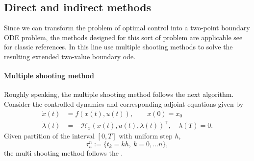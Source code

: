 \subsection{Direct and indirect methods}
Since we can transform the problem of optimal control into a two-point 
boundary ODE problem, the methods designed for this sort of problem are 
applicable see \cite{Keller1976, Ascher1987, Stoer2013} for classic references. 
In this line \cite{Caetano2001,Yan2008} use multiple shooting methods to 
solve the resulting extended two-value boundary ode.
\paragraph{Multiple shooting method}
Roughly speaking, the multiple shooting method follows the next algorithm.
Consider the controlled dynamics and corresponding adjoint equations given by
\begin{equation}
  \label{eqn:extended_tpvbp}
  \begin{aligned}
    \dot{x}(t) &= 
    f(x(t), u(t)), \qquad x(0)=x_0 \\
    \dot{\lambda}(t) &=
    -\mathcal{H}_x(x(t),u(t),\lambda(t))^\top, \quad 
    \lambda(T)=0.
  \end{aligned}
\end{equation}
Given  partition of the interval $[0, T]$ with uniform step $h$,
$$
\tau_h^n:= \{t_k = kh, \ k=0,\dots n\},
$$
the multi shooting method follows the .
